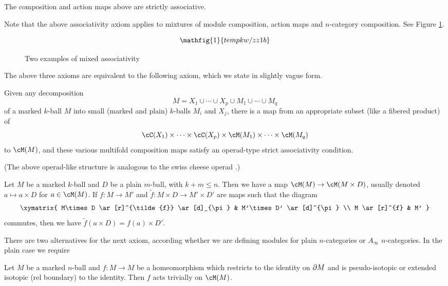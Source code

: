 {The composition and action maps above are strictly associative.}

Note that the above associativity axiom applies to mixtures of module composition,
action maps and $n$-category composition.
See Figure \ref{zzz1b}.

\begin{figure}[!ht]
\begin{equation*}
\mathfig{1}{tempkw/zz1b}
\end{equation*}
\caption{Two examples of mixed associativity}
\label{zzz1b}
\end{figure}


The above three axioms are equivalent to the following axiom,
which we state in slightly vague form.

{Given any decomposition 
\[
	M =  X_1 \cup\cdots\cup X_p \cup M_1\cup\cdots\cup M_q
\]
of a marked $k$-ball $M$
into small (marked and plain) $k$-balls $M_i$ and $X_j$, there is a 
map from an appropriate subset (like a fibered product) 
of 
\[
	\cC(X_1)\times\cdots\times\cC(X_p) \times \cM(M_1)\times\cdots\times\cM(M_q) 
\]
to $\cM(M)$,
and these various multifold composition maps satisfy an
operad-type strict associativity condition.}

(The above operad-like structure is analogous to the swiss cheese operad
.)

{Let $M$ be a marked $k$-ball and $D$ be a plain $m$-ball, with $k+m \le n$.
Then we have a map $\cM(M)\to \cM(M\times D)$, usually denoted $a\mapsto a\times D$ for $a\in \cM(M)$.
If $f:M\to M'$ and $\tilde{f}:M\times D \to M'\times D'$ are maps such that the diagram
\[ \xymatrix{
	M\times D \ar[r]^{\tilde{f}} \ar[d]_{\pi} & M'\times D' \ar[d]^{\pi} \\
	M \ar[r]^{f} & M'
} \]
commutes, then we have $\tilde{f}(a\times D) = f(a)\times D'$.}



There are two alternatives for the next axiom, according whether we are defining
modules for plain $n$-categories or $A_\infty$ $n$-categories.
In the plain case we require

{Let $M$ be a marked $n$-ball and $f: M\to M$ be a homeomorphism which restricts
to the identity on $\partial M$ and is pseudo-isotopic or extended isotopic (rel boundary) to the identity.
Then $f$ acts trivially on $\cM(M)$.}

